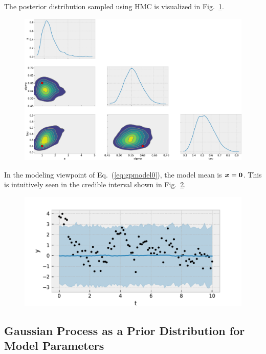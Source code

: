The posterior distribution sampled using HMC is visualized in Fig.~\ref{fig:gp2}.
\begin{figure}[htb]
\begin{center}
\includegraphics[width=\linewidth]{fig/gp/gp2.pdf}
\caption{\label{fig:gp2}}
\end{center}
\end{figure}
In the modeling viewpoint of Eq.~(\ref{eq:gpmodel0}), the model mean is $\boldsymbol{x}=\boldsymbol{0}$. This is intuitively seen in the credible interval shown in Fig.~\ref{fig:gp3}.
\begin{figure}[htb]
\begin{center}
\includegraphics[width=\linewidth]{fig/gp/gp3.pdf}
\caption{\label{fig:gp3}}
\end{center}
\end{figure}

\subsection*{Gaussian Process as a Prior Distribution for Model Parameters}

